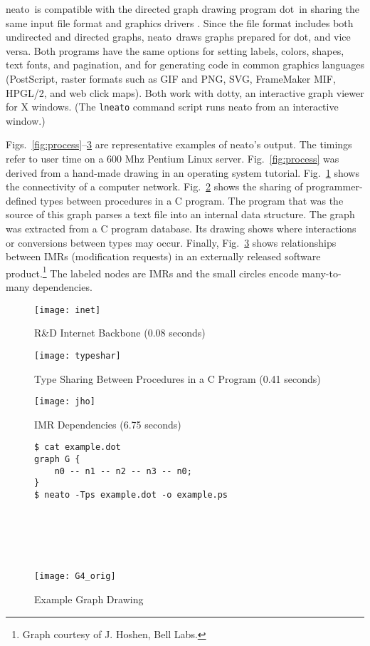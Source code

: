 \documentclass[11pt]{article}
\def\dot{{\sc dot}}
\def\dotty{{\sc dotty}}
\def\neato{{\sc neato}}
\begin{document}
\neato\ is compatible with the directed graph drawing program
\dot\ in sharing the same input file format
and graphics drivers \cite{dotuserguide}.
Since the file format includes both undirected and directed graphs,
\neato\ draws graphs prepared for \dot, and vice versa.
Both programs have the same options for setting labels, colors, shapes,
text fonts, and pagination, and for generating code in common graphics
languages (PostScript, raster formats such as GIF and PNG, SVG,
FrameMaker MIF, HPGL/2, and web click maps).
Both work with \dotty, an interactive graph viewer for X windows.
(The {\tt lneato} command script runs neato from an interactive window.)

Figs.~\ref{fig:process}--\ref{fig:IMR} are representative 
examples of \neato's output.
The timings refer to user time on a 600 Mhz Pentium Linux server.
Fig.~\ref{fig:process} was derived from a hand-made drawing
in an operating system tutorial.
Fig.~\ref{fig:inet} shows the connectivity of a computer network.
Fig.~\ref{fig:typesharing} shows the sharing of programmer-defined types
between procedures in a C program.  The program that was the source
of this graph parses a text file into an internal data structure.
The graph was extracted from a C program database.  Its drawing shows
where interactions or conversions between types may occur.  Finally,
Fig.~\ref{fig:IMR} shows relationships between IMRs (modification requests)
in an externally released software product.\footnote{Graph
courtesy of J. Hoshen, Bell Labs.} The labeled nodes are IMRs and the small circles
encode many-to-many dependencies.
\begin{figure}[h]
	\centerline{\texttt{[image: inet]}}  %
	\vspace{.25in}
    \caption{R\&D Internet Backbone (0.08 seconds)}
    \label{fig:inet}
\end{figure}

\begin{figure}[h]
	\centerline{\texttt{[image: typeshar]}} %
    \caption{Type Sharing Between Procedures in a C Program (0.41 seconds)}
    \label{fig:typesharing}
\end{figure}
\begin{figure}[h]
	\centerline{\texttt{[image: jho]}}  %
	\caption{IMR Dependencies (6.75 seconds)}
	\label{fig:IMR}
\end{figure}
\clearpage

\begin{figure}[h]
\begin{minipage}[b]{2in}
\begin{verbatim}
$ cat example.dot
graph G {
    n0 -- n1 -- n2 -- n3 -- n0;
}
$ neato -Tps example.dot -o example.ps


\end{verbatim}
\end{minipage} \hspace{1.0in} \
\parbox[b]{2.5in}{
	\ \\
    \centerline{\texttt{[image: G4\_orig]}}
}
\caption{Example Graph Drawing}
\label{fig:G4_orig}
\end{figure}
\end{document}
